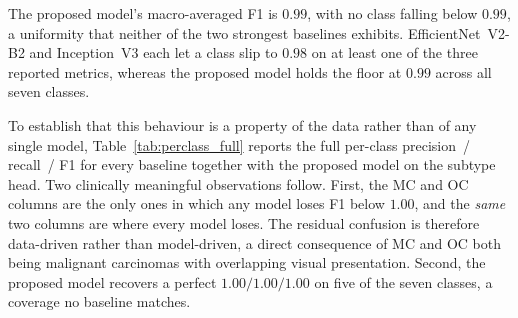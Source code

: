 \begin{table}[!t]
\caption{Per-class subtype performance on the test set, reported as
precision~/ recall~/ F1. Per-class support is given in parentheses. Five of
seven classes reach $1.00$ F1 for the proposed model.}
\label{tab:perclass}
\centering
{}
\end{table}

The proposed model's macro-averaged F1 is $0.99$, with no class falling below
$0.99$, a uniformity that neither of the two strongest baselines exhibits.
EfficientNet~V2-B2 and Inception~V3 each let a class slip to $0.98$ on at least
one of the three reported metrics, whereas the proposed model holds the floor
at $0.99$ across all seven classes.

To establish that this behaviour is a property of the data rather than of any
single model, Table~\ref{tab:perclass_full} reports the full per-class
precision~/ recall~/ F1 for every baseline together with the proposed model on
the subtype head. Two clinically meaningful observations follow. First, the MC
and OC columns are the only ones in which any model loses F1 below $1.00$, and
the \emph{same} two columns are where every model loses. The residual
confusion is therefore data-driven rather than model-driven, a direct
consequence of MC and OC both being malignant carcinomas with overlapping
visual presentation. Second, the proposed model recovers a perfect
$1.00 / 1.00 / 1.00$ on five of the seven classes, a coverage no baseline
matches.

